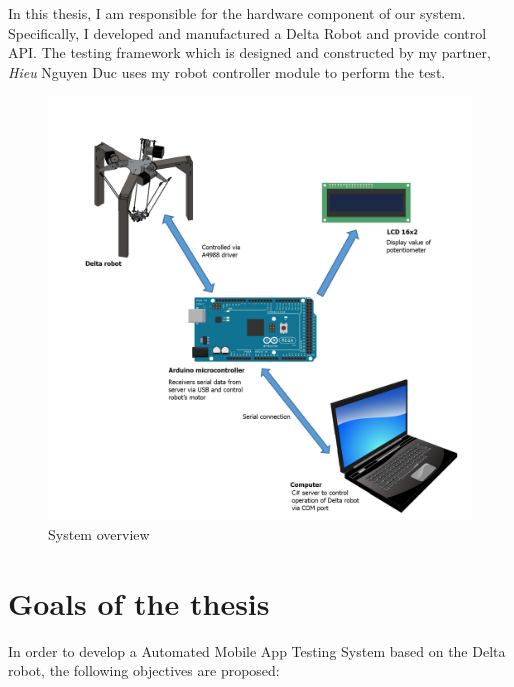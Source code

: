 In this thesis, I am responsible for the hardware component of our system. Specifically, I developed and manufactured a Delta Robot and provide control API. The testing framework which is designed and constructed by my partner, \textit{Hieu} Nguyen Duc uses my robot controller module to perform the test.

\begin{figure}[H]
	\centering
	\includegraphics[width=\maxwidth{15cm}, keepaspectratio]{Chapters/Fig/system_overview.png}
	\caption{System overview}
	\label{fig:system_overview}
\end{figure}

\section{Goals of the thesis}
In order to develop a Automated Mobile App Testing System based on the Delta robot, the following objectives are proposed:

